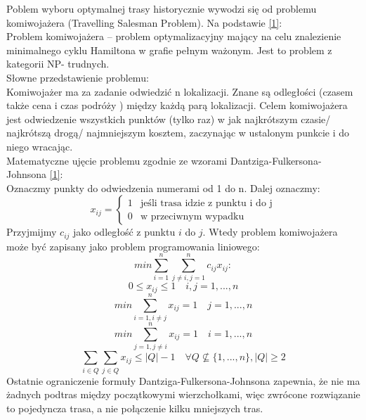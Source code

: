 \documentclass[a4paper, twoside, 12pt, justified]{article}
\begin{document}
	Poblem wyboru optymalnej trasy historycznie wywodzi się od problemu komiwojażera (Travelling Salesman Problem). 
	Na podstawie \hyperlink{komiwojazer}{[1]}:\\
	Problem komiwojażera – problem optymalizacyjny mający na celu znalezienie minimalnego cyklu Hamiltona w grafie pełnym ważonym. Jest to problem z kategorii NP- trudnych.\\
	Słowne przedstawienie problemu:\\ 
	Komiwojażer ma za zadanie odwiedzić n lokalizacji. Znane są odległości (czasem także cena i czas podróży ) między każdą parą lokalizacji.
	Celem komiwojażera jest odwiedzenie wszystkich punktów (tylko raz) w jak najkrótszym czasie/ najkrótszą drogą/ najmniejszym kosztem, zaczynając w ustalonym punkcie i do niego wracając.\\
	Matematyczne ujęcie problemu zgodnie ze wzorami Dantziga-Fulkersona-Johnsona \hyperlink{dfj}{[1]}:\\
	Oznaczmy punkty do odwiedzenia numerami od 1 do n. Dalej oznaczmy:
	\[ x_{ij} = 
	\begin{cases}
	1 &\mbox{jeśli trasa idzie z punktu i do j} \\
	0 &\mbox{w przeciwnym wypadku}
	\end{cases}
	\]
	Przyjmijmy $c_{ij}$ jako odległość z punktu $i$ do $j$. Wtedy problem komiwojażera może być zapisany jako problem programowania liniowego:\\
	  
	  \begin{equation}
		  {min \sum\limits_{i=1}^{n} \sum\limits_{j \neq i, j=1}^{n}}c_{ij}x_{ij}:
	  \end{equation}
	  \begin{equation}
	  	0 \le x_{ij} \le 1 \quad i,j = 1,...,n 
	  \end{equation}
	  \begin{equation}
	  {min \sum\limits_{i=1, i \neq j}^{n}}x_{ij} = 1 \quad j = 1,...,n 
	  \end{equation}
	  \begin{equation}
	  {min \sum\limits_{j=1, j \neq i}^{n}}x_{ij} = 1 \quad i = 1,...,n 
	  \end{equation}
	  \begin{equation}
	  {\sum\limits_{i \in Q} \sum\limits_{j \in Q}}x_{ij} \le |Q|-1 \quad \forall Q \not\subseteq \{1,...,n\}, |Q| \ge 2
	  \end{equation}
	  Ostatnie ograniczenie formuły Dantziga-Fulkersona-Johnsona zapewnia, że nie ma żadnych podtras między początkowymi wierzchołkami, więc zwrócone rozwiązanie to pojedyncza trasa, a nie połączenie kilku mniejszych tras. 
	
\end{document}

